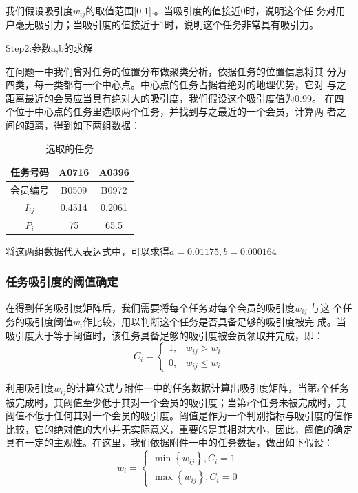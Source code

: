 我们假设吸引度$w_{ij}$的取值范围[0,1].。当吸引度的值接近0时，说明这个任
务对用户毫无吸引力；当吸引度的值接近于1时，说明这个任务非常具有吸引力。

Step2:参数a,b的求解

在问题一中我们曾对任务的位置分布做聚类分析，依据任务的位置信息将其
分为四类，每一类都有一个中心点。中心点的任务占据着绝对的地理优势，它对
与之距离最近的会员应当具有绝对大的吸引度，我们假设这个吸引度值为0.99。
在四个位于中心点的任务里选取两个任务，并找到与之最近的一个会员，计算两
者之间的距离，得到如下两组数据：
\begin{longtable}[c]{c|cc}
    \caption{选取的任务}
    \label{tab:my-table}       \\
    \hline
    任务号码 & A0716  & A0396  \\
    \endfirsthead
    \endhead
    \hline
    \endfoot
    \endlastfoot
    会员编号 & B0509  & B0972  \\
    $I_{ij}$ & 0.4514 & 0.2061 \\
    $P_i$    & 75     & 65.5   \\ \hline
\end{longtable}

将这两组数据代入表达式中，可以求得$a=0.01175,b=0.000164$

\subsubsection{任务吸引度的阈值确定}
在得到任务吸引度矩阵后，我们需要将每个任务对每个会员的吸引度$w_{ij}$ 与这
个任务的吸引度阈值$w_i$作比较，用以判断这个任务是否具备足够的吸引度被完
成。当吸引度大于等于阈值时，该任务具备足够的吸引度被会员领取并完成，即：
$$C_{i}=\left\{\begin{array}{ll}
        1, & w_{i j}>w_{i}      \\
        0, & w_{i j} \leq w_{i}
    \end{array}\right.$$

利用吸引度$w_{ij}$的计算公式与附件一中的任务数据计算出吸引度矩阵，当第$i$个任务被完成时，其阈值至少低于其对一个会员的吸引度；当第$i$个任务未被完成时，其阈值不低于任何其对一个会员的吸引度。阈值是作为一个判别指标与吸引度的值作比较，它的绝对值的大小并无实际意义，重要的是其相对大小，因此，阈值的确定具有一定的主观性。在这里，我们依据附件一中的任务数据，做出如下假设：
$$w_{i}=\left\{\begin{array}{l}
        \min \left\{w_{i j}\right\}, C_{i}=1 \\
        \max \left\{w_{i j}\right\}, C_{i}=0
    \end{array}\right.$$

